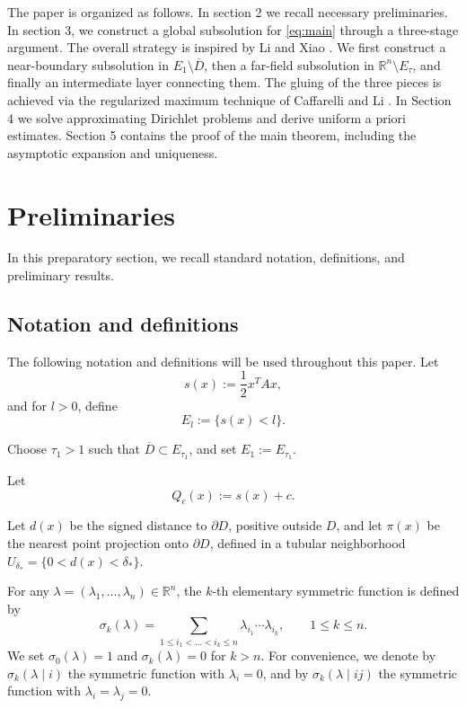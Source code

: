 \documentclass[reqno,a4paper]{amsart}
\numberwithin{equation}{section}
\begin{document}
	
	The paper is organized as follows. In section 2 we recall necessary preliminaries. In  section 3, we construct a global subsolution for \eqref{eq:main} through a three-stage argument. The overall strategy is inspired by Li and Xiao \cite{LYX26}. We first construct a near-boundary subsolution in \(E_1 \setminus \overline{D}\), then a far-field subsolution in \(\mathbb{R}^n \setminus E_\tau\), and finally an intermediate layer connecting them. The gluing of the three pieces is achieved via the regularized maximum technique of Caffarelli and Li \cite{CL03}.  In Section 4 we solve approximating Dirichlet problems and derive uniform a priori estimates. Section 5 contains the proof of the main theorem, including the asymptotic expansion and uniqueness.
	
	\section{Preliminaries}
	In this preparatory section, we recall standard notation, definitions, and preliminary results.
	
	\subsection{Notation and definitions}
	The following notation and definitions will be used throughout this paper.
	Let $$s(x) := \frac12 x^T A x,$$and for $l > 0$, define $$E_l := \{ s(x) < l \}.$$ 
	
	Choose $\tau_1 > 1$ such that $\overline{D} \subset E_{\tau_1}$, and set $E_1 := E_{\tau_1}.$
	
	Let $$Q_c(x) := s(x) + c.$$
	
	Let $d(x)$ be the signed distance to $\partial D$, positive outside $D$, and let $\pi(x)$ be the nearest point projection onto $\partial D$, defined in a tubular neighborhood $U_{\delta_*} = \{ 0 < d(x) < \delta_* \}$.
	
	For any $\lambda = (\lambda_1, \dots, \lambda_n) \in \mathbb{R}^n$, the $k$-th elementary symmetric function is defined by
	\[
	\sigma_k(\lambda) = \sum_{1 \le i_1 < \dots < i_k \le n} \lambda_{i_1} \cdots \lambda_{i_k}, \qquad 1 \le k \le n.
	\]
	We set $\sigma_0(\lambda) = 1$ and $\sigma_k(\lambda) = 0$ for $k > n$. 
	For convenience, we denote by $\sigma_k(\lambda \mid i)$ the symmetric function with $\lambda_i = 0$, and by $\sigma_k(\lambda \mid ij)$ the symmetric function with $\lambda_i = \lambda_j = 0$.
	
\end{document}
